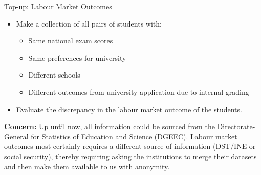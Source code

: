 \documentclass{beamer}
\begin{document}
\begin{frame}{Top-up: Labour Market Outcomes}

\begin{itemize}
    \item Make a collection of all pairs of students with:
    \begin{itemize}
        \item Same national exam scores
        \item Same preferences for university
        \item Different schools
        \item Different outcomes from university application due to internal grading
    \end{itemize}
    \item Evaluate the discrepancy in the labour market outcome of the students.    
\end{itemize}

\textbf{Concern:} Up until now, all information could be sourced from the  Directorate-General for Statistics of Education and Science (DGEEC). Labour market outcomes most certainly requires a different source of information (DST/INE or social security), thereby requiring asking the institutions to merge their datasets and then make them available to us with anonymity.
   
\end{frame}

\end{document}
